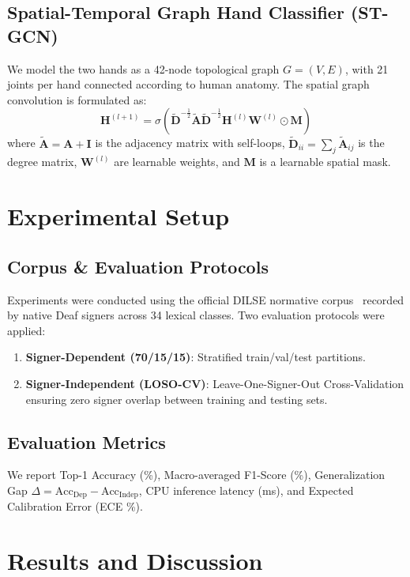 \documentclass[journal,compsoc]{IEEEtran}
\begin{document}
\subsection{Spatial-Temporal Graph Hand Classifier (ST-GCN)}
We model the two hands as a 42-node topological graph $G = (V, E)$, with 21 joints per hand connected according to human anatomy. The spatial graph convolution is formulated as:
\begin{equation}
\mathbf{H}^{(l+1)} = \sigma\left(\mathbf{\tilde{D}}^{-\frac{1}{2}} \mathbf{\tilde{A}} \mathbf{\tilde{D}}^{-\frac{1}{2}} \mathbf{H}^{(l)} \mathbf{W}^{(l)} \odot \mathbf{M}\right)
\end{equation}
where $\mathbf{\tilde{A}} = \mathbf{A} + \mathbf{I}$ is the adjacency matrix with self-loops, $\mathbf{\tilde{D}}_{ii} = \sum_j \mathbf{\tilde{A}}_{ij}$ is the degree matrix, $\mathbf{W}^{(l)}$ are learnable weights, and $\mathbf{M}$ is a learnable spatial mask.

\section{Experimental Setup}

\subsection{Corpus & Evaluation Protocols}
Experiments were conducted using the official DILSE normative corpus~\cite{dilse2023diccionario} recorded by native Deaf signers across 34 lexical classes. Two evaluation protocols were applied:
\begin{enumerate}
    \item \textbf{Signer-Dependent (70/15/15)}: Stratified train/val/test partitions.
    \item \textbf{Signer-Independent (LOSO-CV)}: Leave-One-Signer-Out Cross-Validation ensuring zero signer overlap between training and testing sets.
\end{enumerate}

\subsection{Evaluation Metrics}
We report Top-1 Accuracy (\%), Macro-averaged F1-Score (\%), Generalization Gap $\Delta = \text{Acc}_{\text{Dep}} - \text{Acc}_{\text{Indep}}$, CPU inference latency (ms), and Expected Calibration Error (ECE \%).

\section{Results and Discussion}
\end{document}
